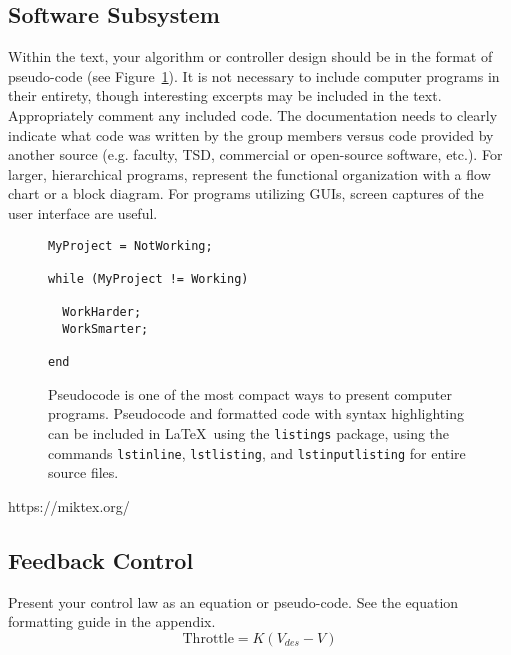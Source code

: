 \documentclass{wsecapstone}
\begin{document}
\subsection{Software Subsystem}
Within the text, your algorithm or controller design should be in the format of pseudo-code (see Figure~\ref{f3}). It is not necessary to include computer programs in their entirety, though interesting excerpts may be included in the text. Appropriately comment any included code. The documentation needs to clearly indicate what code was written by the group members versus code provided by another source (e.g. faculty, TSD, commercial or open-source software, etc.).  For larger, hierarchical programs, represent the functional organization with a flow chart or a block diagram.  For programs utilizing GUIs, screen captures of the user interface are useful.   
\begin{figure}
\begin{lstlisting}
MyProject = NotWorking; 

while (MyProject != Working)

  WorkHarder;
  WorkSmarter;

end
\end{lstlisting}
\caption{Pseudocode is one of the most compact ways to present computer programs. Pseudocode and formatted code with syntax highlighting can be included in \LaTeX\ using the \lstinline{listings} package, using the commands \lstinline{lstinline}, \lstinline{lstlisting}, and \lstinline{lstinputlisting} for entire source files.}
\label{f3}
\end{figure}
  https://miktex.org/
\subsection{Feedback Control}
Present your control law as an equation or pseudo-code.   See the equation formatting guide in the appendix.  
\begin{equation}
\mbox{Throttle} = K (V_{des} - V)
\end{equation}
\end{document}
